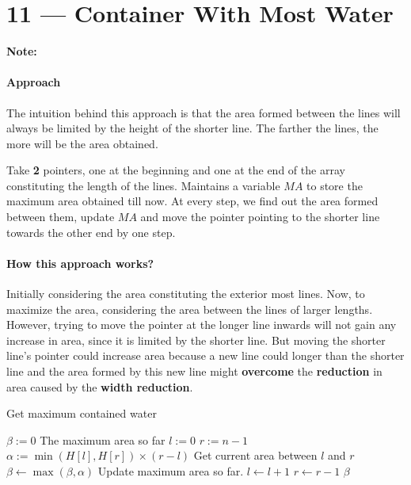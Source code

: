 \documentclass[a4paper,12pt]{article}
\begin{document}
\section{11 --- Container With Most Water}

\textbf{\large{Note:}}
\paragraph{Approach}
The intuition behind this approach is that the area formed between the lines will always be limited by the height of the {\color{red}shorter} line. The farther the lines, the more will be the area obtained.
\par
Take \textbf{2} pointers, one at the beginning and one at the end of the array constituting the length of the lines. Maintains a variable $MA$ to store the {\color{red}maximum} area obtained till now. At every step, we find out the area formed between them, update $MA$ and move the pointer pointing to the shorter line towards the other end by one step.
\paragraph{How this approach works?}
Initially considering the area constituting the exterior most lines. Now, to maximize the area, considering the area between the lines of {\color{red}larger} lengths. However, trying to move the pointer at the {\color{red}longer} line inwards will not gain any increase in area, since it is limited by the {\color{red}shorter} line. But moving the shorter line's pointer could increase area because a new line could longer than the shorter line and the area formed by this new line might \textbf{overcome} the \textbf{reduction} in area caused by the \textbf{width reduction}.
\setcounter{algorithm}{0}
\begin{algorithm}[H]
\caption{Get maximum contained water}
\begin{algorithmic}[1]
\Statex
{}
\State $\beta:=0$ \Comment The maximum area so far
\State $l:=0$
\State $r:=n - 1$ \Comment 
{}
\State $\alpha := \min(H[l], H[r])\times(r-l)$ \Comment Get current area between $l$ and $r$
\State $\beta \gets \max(\beta, \alpha)$ \Comment Update maximum area so far.
\State $l \gets l+1$
\Else
\State $r \gets r-1$
\EndIf
\EndWhile
\State \Return $\beta$
\EndProcedure
\Statex
\end{algorithmic}
\end{algorithm}
\end{document}
